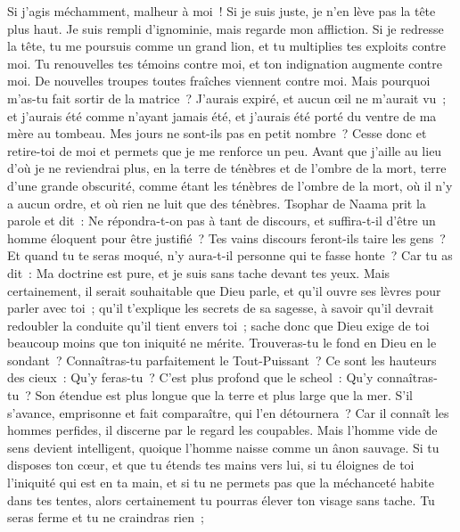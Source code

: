 \begin{multicols}{2}
Si j'agis méchamment, malheur à moi~! Si je suis juste, je n'en lève pas la tête plus haut. Je suis rempli d'ignominie, mais regarde mon affliction. 
Si je redresse la tête, tu me poursuis comme un grand lion, et tu multiplies tes exploits contre moi.
Tu renouvelles tes témoins contre moi, et ton indignation augmente contre moi. De nouvelles troupes toutes fraîches viennent contre moi.
Mais pourquoi m'as-tu fait sortir de la matrice~? J'aurais expiré, et aucun œil ne m'aurait vu~;
et j'aurais été comme n'ayant jamais été, et j'aurais été porté du ventre de ma mère au tombeau.
Mes jours ne sont-ils pas en petit nombre~? Cesse donc et retire-toi de moi et permets que je me renforce un peu.
Avant que j'aille au lieu d'où je ne reviendrai plus, en la terre de ténèbres et de l'ombre de la mort,
terre d'une grande obscurité, comme étant les ténèbres de l'ombre de la mort, où il n'y a aucun ordre, et où rien ne luit que des ténèbres. 
\VerseOne{}Tsophar de Naama prit la parole et dit~:
Ne répondra-t-on pas à tant de discours, et suffira-t-il d'être un homme éloquent pour être justifié~?
Tes vains discours feront-ils taire les gens~? Et quand tu te seras moqué, n'y aura-t-il personne qui te fasse honte~?
Car tu as dit~: Ma doctrine est pure, et je suis sans tache devant tes yeux. 
Mais certainement, il serait souhaitable que Dieu parle, et qu'il ouvre ses lèvres pour parler avec toi~;
qu'il t'explique les secrets de sa sagesse, à savoir qu'il devrait redoubler la conduite qu'il tient envers toi~; sache donc que Dieu exige de toi beaucoup moins que ton iniquité ne mérite.
Trouveras-tu le fond en Dieu en le sondant~? Connaîtras-tu parfaitement le Tout-Puissant~? 
Ce sont les hauteurs des cieux~: Qu'y feras-tu~? C'est plus profond que le scheol~: Qu'y connaîtras-tu~?
Son étendue est plus longue que la terre et plus large que la mer.
S'il s'avance, emprisonne et fait comparaître, qui l'en détournera~?
Car il connaît les hommes perfides, il discerne par le regard les coupables.
Mais l'homme vide de sens devient intelligent, quoique l'homme naisse comme un ânon sauvage.
Si tu disposes ton cœur, et que tu étends tes mains vers lui,
si tu éloignes de toi l'iniquité qui est en ta main, et si tu ne permets pas que la méchanceté habite dans tes tentes, 
alors certainement tu pourras élever ton visage sans tache. Tu seras ferme et tu ne craindras rien~;

\end{multicols}

